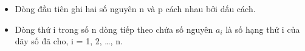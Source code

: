 \begin{itemize}
	\item     Dòng đầu tiên ghi hai số nguyên n và p cách nhau bởi dấu cách.   
	\item     Dòng thứ i trong số n dòng tiếp theo chứa số nguyên $a_{i}$    là số hạng thứ i của dãy số đã  cho, i = 1, 2, …, n.   
\end{itemize}